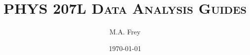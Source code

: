 \documentclass[letterpaper, 12pt]{report}
\begin{document}
\title{\textsc{PHYS 207L Data Analysis Guides}}
\author{M.A. Frey}
\date{\today}
\maketitle
\tableofcontents













\end{document}
